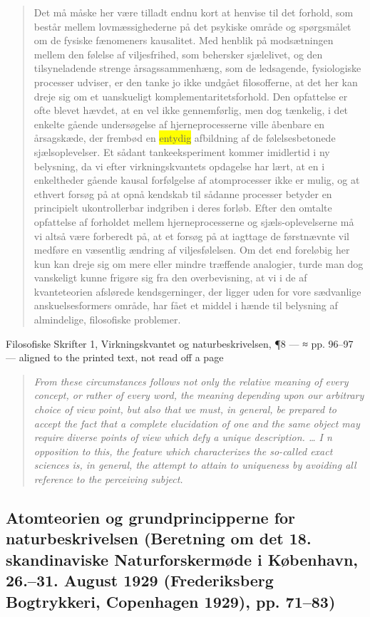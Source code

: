 \documentclass[11pt]{article}
\newcommand{\dcite}[1]{{\nopagebreak\raggedleft\small #1\par}\medskip}
\newcommand{\tlg}[1]{{\setlength{\fboxsep}{0.8pt}\colorbox{yellow}{#1}}}
\newcommand{\olg}[1]{{\setlength{\fboxsep}{0.8pt}\colorbox{cyan!25}{#1}}}
\begin{document}
\begin{quote}
Det må måske her være tilladt endnu kort at henvise til det forhold, som består mellem lovmæssighederne på det psykiske område og spørgsmålet om de fysiske fænomeners kausalitet. Med henblik på modsætningen mellem den følelse af viljesfrihed, som behersker sjælelivet, og den tilsyneladende strenge årsagssammenhæng, som de ledsagende, fysiologiske processer udviser, er den tanke jo ikke undgået filosofferne, at det her kan dreje sig om et uanskueligt komplementaritetsforhold. Den opfattelse er ofte blevet hævdet, at en vel ikke gennemførlig, men dog tænkelig, i det enkelte gående undersøgelse af hjerneprocesserne ville åbenbare en årsagskæde, der frembød en \tlg{entydig} afbildning af de følelsesbetonede sjælsoplevelser. Et sådant tankeeksperiment kommer imidlertid i ny belysning, da vi efter virkningskvantets opdagelse har lært, at en i enkeltheder gående kausal forfølgelse af atomprocesser ikke er mulig, og at ethvert forsøg på at opnå kendskab til sådanne processer betyder en principielt ukontrollerbar indgriben i deres forløb. Efter den omtalte opfattelse af forholdet mellem hjerneprocesserne og sjæls-oplevelserne må vi altså være forberedt på, at et forsøg på at iagttage de førstnævnte vil medføre en væsentlig ændring af viljesfølelsen. Om det end foreløbig her kun kan dreje sig om mere eller mindre træffende analogier, turde man dog vanskeligt kunne frigøre sig fra den overbevisning, at vi i de af kvanteteorien afslørede kendsgerninger, der ligger uden for vore sædvanlige anskuelsesformers område, har fået et middel i hænde til belysning af almindelige, filosofiske problemer.
\end{quote}
\dcite{Filosofiske Skrifter 1, Virkningskvantet og naturbeskrivelsen, ¶8 — ≈ pp. 96–97 — aligned to the printed text, not read off a page}
{\footnotesize\begin{quote}\itshape
From these circumstances follows not only the relative meaning of every concept, or rather of every word, the meaning depending upon our arbitrary choice of view point, but also that we must, in general, be prepared to accept the fact that a complete elucidation of one and the same object may require diverse points of view which defy a \olg{unique} description. … I n opposition to this, the feature which characterizes the so-called exact sciences is, in general, the attempt to attain to \olg{uniqueness} by avoiding all reference to the perceiving subject.
\end{quote}}

\subsection{Atomteorien og grundprincipperne for naturbeskrivelsen \normalfont(Beretning om det 18. skandinaviske Naturforskermøde i København, 26.–31. August 1929 (Frederiksberg Bogtrykkeri, Copenhagen 1929), pp. 71–83)}
\end{document}
